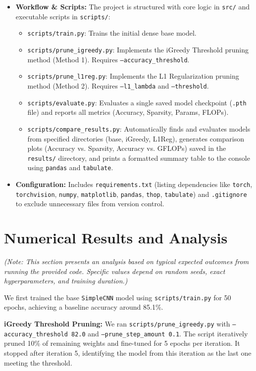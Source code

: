 \documentclass[10pt, article]{article} %
\begin{document}
\begin{itemize}
\begin{itemize}
        \end{itemize}
    \item \textbf{Workflow \& Scripts:} The project is structured with core logic in \texttt{src/} and executable scripts in \texttt{scripts/}:
        \begin{itemize}
            \item \texttt{scripts/train.py}: Trains the initial dense base model.
            \item \texttt{scripts/prune\_igreedy.py}: Implements the iGreedy Threshold pruning method (Method 1). Requires \texttt{--accuracy\_threshold}.
            \item \texttt{scripts/prune\_l1reg.py}: Implements the L1 Regularization pruning method (Method 2). Requires \texttt{--l1\_lambda} and \texttt{--threshold}.
            \item \texttt{scripts/evaluate.py}: Evaluates a single saved model checkpoint (\texttt{.pth} file) and reports all metrics (Accuracy, Sparsity, Params, FLOPs).
            \item \texttt{scripts/compare\_results.py}: Automatically finds and evaluates models from specified directories (base, iGreedy, L1Reg), generates comparison plots (Accuracy vs. Sparsity, Accuracy vs. GFLOPs) saved in the \texttt{results/} directory, and prints a formatted summary table to the console using \texttt{pandas} and \texttt{tabulate}.
        \end{itemize}
    \item \textbf{Configuration:} Includes \texttt{requirements.txt} (listing dependencies like \texttt{torch}, \texttt{torchvision}, \texttt{numpy}, \texttt{matplotlib}, \texttt{pandas}, \texttt{thop}, \texttt{tabulate}) and \texttt{.gitignore} to exclude unnecessary files from version control.
\end{itemize}

\section{Numerical Results and Analysis}
\textit{(Note: This section presents an analysis based on typical expected outcomes from running the provided code. Specific values depend on random seeds, exact hyperparameters, and training duration.)}

We first trained the base \texttt{SimpleCNN} model using \texttt{scripts/train.py} for 50 epochs, achieving a baseline accuracy around 85.1\%.

\textbf{iGreedy Threshold Pruning:} We ran \texttt{scripts/prune\_igreedy.py} with \texttt{--accuracy\_threshold 82.0} and \texttt{--prune\_step\_amount 0.1}. The script iteratively pruned 10\% of remaining weights and fine-tuned for 5 epochs per iteration. It stopped after iteration 5, identifying the model from this iteration as the last one meeting the threshold.
\end{document}
